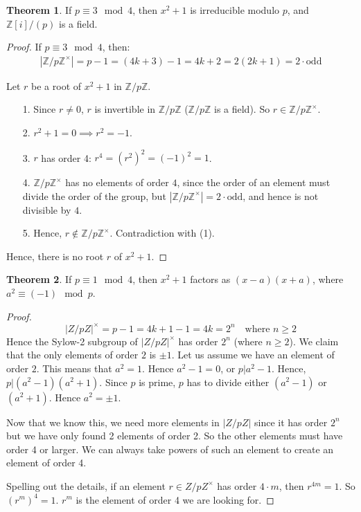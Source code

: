 \documentclass{book}
\newcommand{\Z}{\ensuremath{\mathbb{Z}}}
\theoremstyle{definition}
\newtheorem{theorem}{Theorem}
\begin{document}
\begin{theorem}
If $p \equiv 3 \mod 4$, then $x^2+1$ is irreducible modulo $p$,
and $\Z[i]/(p)$ is a field.
\end{theorem}
\begin{proof}
If $p \equiv 3 \mod 4$, then:
\begin{align*}
|\Z/p\Z^\times| = p - 1 = (4k + 3) - 1 = 4k + 2 = 2(2k + 1) = 2 \cdot \text{odd}
\end{align*}

Let $r$ be a root of $x^2 + 1$ in $\Z/p\Z$. 
\begin{itemize}
\item[1.] Since $r \neq 0$, $r$ is invertible in $\Z/p\Z$ ($\Z/p\Z$ is a field). So $r \in \Z/p\Z^\times$.
\item[2.] $r^2 + 1 = 0 \implies r^2 = -1$.
\item[3.] $r$ has order 4: $r^4 = (r^2)^2 = (-1)^2 = 1$.
\item[4.] $\Z/p\Z^\times$ has no elements of order $4$, since the order of an element
 must divide the order of the group, but $|\Z/p\Z^\times| = 2\cdot \text{odd}$,
 and hence is not divisible by $4$.
\item[5.] Hence, $r \not \in \Z/p\Z^\times$. Contradiction with (1).
\end{itemize}
Hence, there is no root $r$ of $x^2 + 1$.
\end{proof}

\begin{theorem}
    If $p \equiv 1 \mod 4$, then $x^2+1$ factors as $(x-a)(x+a)$, where
    $a^2 \equiv (-1) \mod p$.
\end{theorem}
\begin{proof}
    $$|Z/pZ|^\times = p - 1 = 4k + 1 - 1 = 4k = 2^n \quad \text{where $n \geq 2$}$$
    Hence the Sylow-2 subgroup of $|Z/pZ|^\times$ has order $2^n$ (where $n \geq 2$).
    We claim that the only elements of order $2$ is $\pm 1$. Let us assume
    we have an element of order $2$. This means that $a^2 = 1$. Hence $a^2 - 1 = 0$,
    or $p | a^2 - 1$. Hence, $p | (a^2 - 1) (a^2 + 1)$. Since $p$ is prime,
    $p$ has to divide either $(a^2 - 1)$ or $(a^2+1)$. Hence $a^2 = \pm 1$.

    Now that we know this, we need more elements in $|Z/pZ|$ since it has order $2^n$
    but we have only found 2 elements of order 2. So the other elements
    must have order 4 or larger. We can always take powers of such an element
    to create an element of order 4.

    Spelling out the details, if an element $r \in Z/pZ^\times$ has order
    $4 \cdot m$, then $r^{4m} = 1$. So $(r^m)^4 = 1$. $r^m$ is the element
    of order 4 we are looking for.
\end{proof}
\end{document}
